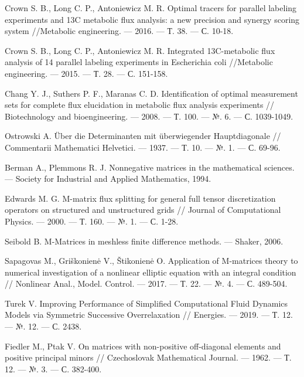 \documentclass[14pt, a4paper]{extreport}
\begin{document}
\begin{thebibliography}{XXXX}
	Crown S. B., Long C. P., Antoniewicz M. R. Optimal tracers for parallel labeling experiments and 13C metabolic flux analysis: a new precision and synergy scoring system //Metabolic engineering. --- 2016. --- Т. 38. --- С. 10-18.
	
	Crown S. B., Long C. P., Antoniewicz M. R. Integrated 13C-metabolic flux analysis of 14 parallel labeling experiments in Escherichia coli //Metabolic engineering. --- 2015. --- Т. 28. --- С. 151-158.
	
	Chang Y. J., Suthers P. F., Maranas C. D. Identification of optimal measurement sets for complete flux elucidation in metabolic flux analysis experiments // Biotechnology and bioengineering. --- 2008. --- Т. 100. --- №. 6. --- С. 1039-1049.
	
	Ostrowski A. Über die Determinanten mit überwiegender Hauptdiagonale // Commentarii Mathematici Helvetici. --- 1937. --- Т. 10. --- №. 1. --- С. 69-96.
	
	Berman A., Plemmons R. J. Nonnegative matrices in the mathematical sciences. --- Society for Industrial and Applied Mathematics, 1994.
	
	Edwards M. G. M-matrix flux splitting for general full tensor discretization operators on structured and unstructured grids // Journal of Computational Physics. --- 2000. --- Т. 160. --- №. 1. --- С. 1-28.
	
	Seibold B. M-Matrices in meshless finite difference methods. --- Shaker, 2006.
	
	Sapagovas M., Griškonienė V., Štikonienė O. Application of M-matrices theory to numerical investigation of a nonlinear elliptic equation with an integral condition //  Nonlinear Anal., Model. Control. --- 2017. --- Т. 22. --- №. 4. --- С. 489-504.
	
	Turek V. Improving Performance of Simplified Computational Fluid Dynamics Models via Symmetric Successive Overrelaxation // Energies. --- 2019. --- Т. 12. --- №. 12. --- С. 2438.
	
	Fiedler M., Ptak V. On matrices with non-positive off-diagonal elements and positive principal minors // Czechoslovak Mathematical Journal. --- 1962. --- Т. 12. --- №. 3. --- С. 382-400.
	

\end{thebibliography}
\end{document}
